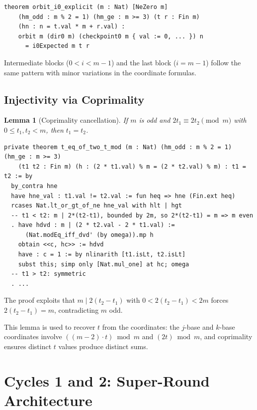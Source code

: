 \documentclass[11pt,a4paper]{article}
\newtheorem{lemma}[theorem]{Lemma}
\begin{document}
\begin{lstlisting}[caption={Orbit matches the formula}]
theorem orbit_i0_explicit (m : Nat) [NeZero m]
    (hm_odd : m % 2 = 1) (hm_ge : m >= 3) (t r : Fin m)
    (hn : n = t.val * m + r.val) :
    orbit m (dir0 m) (checkpoint0 m { val := 0, ... }) n
      = i0Expected m t r
\end{lstlisting}

Intermediate blocks ($0 < i < m{-}1$) and the last block ($i = m{-}1$)
follow the same pattern with minor variations in the coordinate formulas.

\subsection{Injectivity via Coprimality}

\begin{lemma}[Coprimality cancellation]
\label{lem:coprime}
If $m$ is odd and $2t_1 \equiv 2t_2 \pmod{m}$ with $0 \le t_1, t_2 < m$,
then $t_1 = t_2$.
\end{lemma}

\begin{lstlisting}[caption={Coprimality cancellation}]
private theorem t_eq_of_two_t_mod (m : Nat) (hm_odd : m % 2 = 1) (hm_ge : m >= 3)
    (t1 t2 : Fin m) (h : (2 * t1.val) % m = (2 * t2.val) % m) : t1 = t2 := by
  by_contra hne
  have hne_val : t1.val != t2.val := fun heq => hne (Fin.ext heq)
  rcases Nat.lt_or_gt_of_ne hne_val with hlt | hgt
  -- t1 < t2: m | 2*(t2-t1), bounded by 2m, so 2*(t2-t1) = m => m even
  . have hdvd : m | (2 * t2.val - 2 * t1.val) :=
      (Nat.modEq_iff_dvd' (by omega)).mp h
    obtain <<c, hc>> := hdvd
    have : c = 1 := by nlinarith [t1.isLt, t2.isLt]
    subst this; simp only [Nat.mul_one] at hc; omega
  -- t1 > t2: symmetric
  . ...
\end{lstlisting}

The proof exploits that $m \mid 2(t_2 - t_1)$ with $0 < 2(t_2 - t_1) < 2m$
forces $2(t_2 - t_1) = m$, contradicting $m$ odd.

This lemma is used to recover $t$ from the coordinates:
the $j$-base and $k$-base coordinates involve $((m{-}2) \cdot t) \bmod m$
and $(2t) \bmod m$, and coprimality ensures distinct $t$ values produce distinct sums.

\section{Cycles 1 and 2: Super-Round Architecture}
\label{sec:cycles12}
\end{document}
